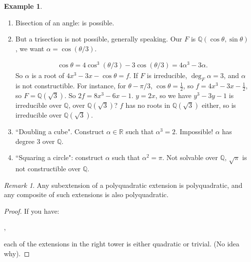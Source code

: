 \documentclass[9pt,reqno,twoside]{amsbook}
\theoremstyle{plain}
\numberwithin{section}{chapter}
\numberwithin{equation}{chapter}
\theoremstyle{definition}
\newtheorem{Ex}[theorem]{Example}
\theoremstyle{remark}
\newtheorem{rem}[theorem]{Remark}
\theoremstyle{plain}
\newcommand{\R}{\mathbb{R}}
\newcommand{\Q}{\mathbb{Q}}
\newcommand{\bee}{\begin{equation}\begin{aligned}}
\newcommand{\eee}{\end{aligned}\end{equation}}
\newcommand{\fracc}{\frac}
\newcommand{\lpar}{\left(}
\newcommand{\rpar}{\right)}
\newcommand{\qwe}{\sqrt}
\begin{document}
\begin{Ex}

\begin{enumerate}
\item Bisection of an angle: is possible. 

\item But a trisection is not possible, generally speaking. Our $F$ is $\Q(\cos \theta, \sin \theta)$, we want $\alpha = \cos\lpar \theta/3 \rpar$. 

\bee
\cos \theta = 4 \cos^3\lpar \theta/3 \rpar  - 3 \cos\lpar \theta/3 \rpar  = 4\alpha^3 - 3 \alpha. 
\eee
So $\alpha$ is a root of $4x^3 - 3x - \cos\theta = f$. If $F$ is irreducible, $\deg_F\alpha = 3$, and $\alpha$ is not constructible. For instance, for $\theta - \pi/3$, $\cos \theta = \fracc{1}{2}$, so $f = 4x^3 - 3x - \fracc{1}{2}$, so $F = \Q(\sqrt{3})$. So $2f = 8x^3 - 6x - 1$. $y  = 2x$, so we have $y^3 - 3y - 1$ is irreducible over $\Q$, over $\Q(\qwe{3})$? $f$ has no roots in $\Q(\qwe{3})$ either, so is irreducible over $\Q(\qwe{3})$. 

\item ``Doubling a cube". Construct $\alpha \in \R$ such that $\alpha^3 = 2$. Impossible! $\alpha$ has degree 3 over $\Q$. 

\item ``Squaring a circle": construct $\alpha$ such that $\alpha^2 = \pi$. Not solvable over $\Q$, $\qwe{\pi}$ is not constructible over $\Q$. 
\end{enumerate}
\end{Ex}

\begin{rem}
Any subextension of a polyquadratic extension is polyquadratic, and any composite of such extensions is also polyquadratic. 
\end{rem}

\begin{proof}
If you have:

\begin{center}
,
\end{center}
each of the extensions in the right tower is either quadratic or trivial. (No idea why). 
\end{proof}
\end{document}
